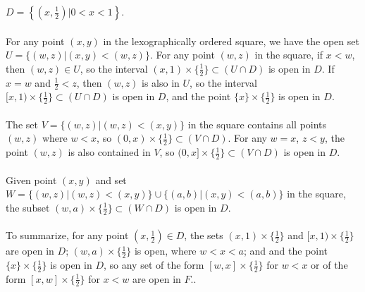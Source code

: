 \documentclass{article}
\begin{document}
$D = \left\lbrace \left( x, \frac{1}{2}\right) | 0 < x < 1 \right\rbrace$. \\ 
\\ 
For any point $(x, y)$ in the lexographically ordered square, we have the open set 
 $U = \{ (w, z) | (x, y) < (w, z) \}$.  For any point $(w, z)$ in the square, if $x < w$, then 
 $(w, z) \in U$, so the interval $(x, 1) \times \{\frac{1}{2}\} \subset (U \cap D)$ is open in $D$.  If $x = w$ and $\frac{1}{2} < z$, then 
 $(w, z)$ is also in $U$, so the interval $[x, 1) \times \{\frac{1}{2}\} \subset (U \cap D)$ is open in $D$, and the point $\{x \} \times \{\frac{1}{2}\}$ 
 is open in $D$.\\ 
 \\ 
The set $V = \{ (w, z) | (w, z) < (x, y) \}$ in the square contains all points $(w, z)$ where $w < x$, so  
$(0, x) \times \{ \frac{1}{2} \} \subset (V \cap D)$.  For any $w = x$, $z < y$, the point $(w, z)$ is also contained in $V$, 
so $(0, x] \times \{ \frac{1}{2} \} \subset (V \cap D)$ is open in $D$. \\ 
\\ 
Given point $(x, y)$ and set $W = \{ (w, z) | (w, z) < (x, y) \} \cup \{ (a, b) | (x, y) < (a, b) \}$ in the square, the subset 
$(w, a) \times \{ \frac{1}{2} \} \subset (W \cap D)$ is open in $D$.\\ 
\\ 
To summarize, for any point $(x, \frac{1}{2}) \in D$, the sets $(x, 1) \times \{ \frac{1}{2} \}$ and 
$[x, 1) \times \{ \frac{1}{2} \}$ are open in $D$; $(w, a) \times \{ \frac{1}{2} \}$ is open, where $w < x < a$; 
and and the point $\{x\} \times \{\frac{1}{2}\}$ is open in $D$, so any set of the form $[w, x] \times \{\frac{1}{2}\}$ for $w < x$ 
or of the form $[x, w]\times \{\frac{1}{2}\}$ for $x < w$ are open in $F$.. \\

\newpage
\end{document}
